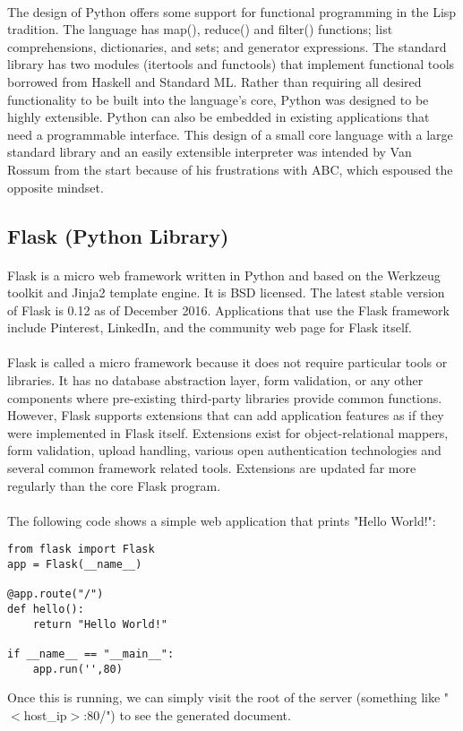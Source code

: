 \paragraph{}
The design of Python offers some support for functional programming in the Lisp tradition. The language has map(), reduce() and filter() functions; list comprehensions, dictionaries, and sets; and generator expressions. The standard library has two modules (itertools and functools) that implement functional tools borrowed from Haskell and Standard ML. Rather than requiring all desired functionality to be built into the language's core, Python was designed to be highly extensible. Python can also be embedded in existing applications that need a programmable interface. This design of a small core language with a large standard library and an easily extensible interpreter was intended by Van Rossum from the start because of his frustrations with ABC, which espoused the opposite mindset.

\subsection{Flask (Python Library)}
\paragraph{}
Flask is a micro web framework written in Python and based on the Werkzeug toolkit and Jinja2 template engine. It is BSD licensed. The latest stable version of Flask is 0.12 as of December 2016. Applications that use the Flask framework include Pinterest, LinkedIn, and the community web page for Flask itself.
\paragraph{}
Flask is called a micro framework because it does not require particular tools or libraries. It has no database abstraction layer, form validation, or any other components where pre-existing third-party libraries provide common functions. However, Flask supports extensions that can add application features as if they were implemented in Flask itself. Extensions exist for object-relational mappers, form validation, upload handling, various open authentication technologies and several common framework related tools. Extensions are updated far more regularly than the core Flask program.
\paragraph{}
The following code shows a simple web application that prints "Hello World!":
\begin{verbatim}
from flask import Flask
app = Flask(__name__)

@app.route("/")
def hello():
    return "Hello World!"

if __name__ == "__main__":
    app.run('',80)
\end{verbatim}
Once this is running, we can simply visit the root of the server (something like "$<$host\_ip$>$:80/") to see the generated document.

